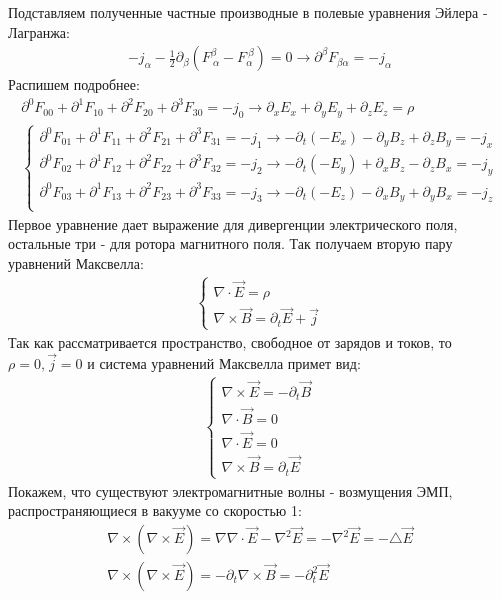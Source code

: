 Подставляем полученные частные производные в полевые уравнения Эйлера - Лагранжа:
\begin{gather*}
-j_\alpha - \frac{1}{2} \partial_\beta\left(F^\beta_{\ \alpha} - F_\alpha^{\ \beta}\right) = 0 \rightarrow \partial^\beta F_{\beta\alpha} = -j_\alpha
\end{gather*}
Распишем подробнее:
\begin{gather*}
\partial^0F_{00} + \partial^1F_{10} + \partial^2 F_{20} + \partial^3F_{30} = -j_0 \rightarrow \partial_x E_x + \partial_y E_y + \partial_z E_z = \rho\\
\begin{cases}
\partial^0F_{01} + \partial^1F_{11} + \partial^2 F_{21} + \partial^3F_{31} = -j_1 \rightarrow -\partial_t(- E_x) - \partial_y B_z + \partial_z B_y = -j_x\\
\partial^0F_{02} + \partial^1F_{12} + \partial^2 F_{22} + \partial^3F_{32} = -j_2 \rightarrow -\partial_t(- E_y) + \partial_x B_z - \partial_z B_x = -j_y\\
\partial^0F_{03} + \partial^1F_{13} + \partial^2 F_{23} + \partial^3F_{33} = -j_3 \rightarrow -\partial_t(- E_z) - \partial_x B_y + \partial_y B_x = -j_z\\
\end{cases}
\end{gather*}
Первое уравнение дает выражение для дивергенции электрического поля, остальные три - для ротора магнитного поля. Так получаем вторую пару уравнений Максвелла:
\begin{gather*}
\begin{cases}
\nabla \cdot \vec E = \rho\\
\nabla \times \vec B = \partial_t \vec E + \vec j
\end{cases}
\end{gather*}
Так как рассматривается пространство, свободное от зарядов и токов, то $\rho = 0, \vec j = 0$ и система уравнений Максвелла примет вид:
 \begin{gather*}
 \begin{cases}
 \nabla \times \vec E = -\partial_t \vec B\\
\nabla \cdot \vec B = 0\\
\nabla \cdot \vec E = 0\\
\nabla \times \vec B = \partial_t \vec E
 \end{cases}
 \end{gather*}
Покажем, что существуют электромагнитные волны - возмущения ЭМП, распространяющиеся в вакууме со скоростью 1:
\begin {gather*}
\nabla \times \left(\nabla \times \vec E\right) = \nabla\nabla \cdot \vec E - \nabla^2 \vec E = -\nabla^2\vec E = -\triangle \vec E\\
\nabla \times \left(\nabla \times \vec E\right) = -\partial_t \nabla \times \vec B = -\partial^2_t \vec E
 \end{gather*}
